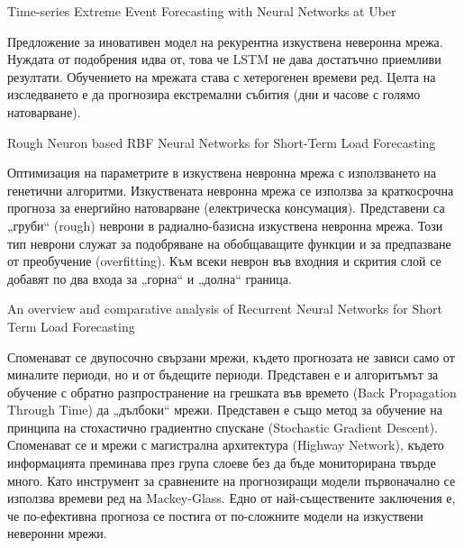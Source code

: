 ﻿Time-series Extreme Event Forecasting with Neural Networks at Uber

Предложение за иновативен модел на рекурентна изкуствена неверонна мрежа. Нуждата от подобрения идва от, това че LSTM не дава достатъчно приемливи резултати. Обучението на мрежата става с хетерогенен времеви ред. Целта на изследването е да прогнозира екстремални събития (дни и часове с голямо натоварване). 

Rough Neuron based RBF Neural Networks for Short-Term Load Forecasting

Оптимизация на параметрите в изкуствена невронна мрежа с използването на генетични алгоритми. Изкуствената невронна мрежа се използва за краткосрочна прогноза за енергийно натоварване (електрическа консумация). Представени са „груби“ (rough) неврони в радиално-базисна изкуствена невронна мрежа. Този тип неврони служат за подобряване на обобщаващите функции и за предпазване от преобучение (overfitting). Към всеки неврон във входния и скрития слой се добавят по два входа за „горна“ и „долна“ граница. 

An overview and comparative analysis of Recurrent Neural Networks for Short Term Load Forecasting

Споменават се двупосочно свързани мрежи, където прогнозата не зависи само от миналите периоди, но и от бъдещите периоди. Представен е и алгоритъмът за обучение с обратно разпространение на грешката във времето (Back Propagation Through Time) да „дълбоки“ мрежи. Представен е също метод за обучение на принципа на стохастично градиентно спускане (Stochastic Gradient Descent). Споменават се и мрежи с магистрална архитектура (Highway Network), където информацията преминава през група слоеве без да бъде мониторирана твърде много. Като инструмент за сравнените на прогнозиращи модели първоначално се използва времеви ред на Mackey-Glass. Едно от най-съществените заключения е, че по-ефективна прогноза се постига от по-сложните модели на изкуствени неверонни мрежи. 

